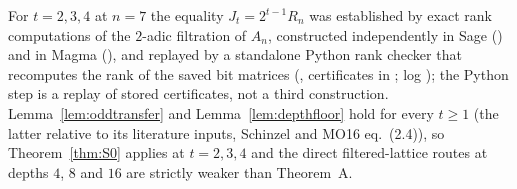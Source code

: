 For $t=2,3,4$ at $n=7$ the equality $J_t=2^{t-1}R_n$ was established by exact rank computations of the $2$-adic filtration of $A_n$, constructed independently in Sage () and in Magma (), and replayed by a standalone Python rank checker that recomputes the rank of the saved bit matrices (, certificates in ; log ); the Python step is a replay of stored certificates, not a third construction. Lemma~\ref{lem:oddtransfer} and Lemma~\ref{lem:depthfloor} hold for every $t\ge1$ (the latter relative to its literature inputs, Schinzel and MO16 eq.~(2.4)), so Theorem~\ref{thm:S0} applies at $t=2,3,4$ and the direct filtered-lattice routes at depths $4$, $8$ and $16$ are strictly weaker than Theorem~A.
